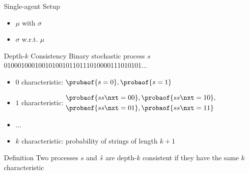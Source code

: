 \begin{frame}{Single-agent Setup}


\bigskip
{}

\begin{itemize}
  \item \(\mu\)  with \(\sigma\)
  \item \(\sigma\)  w.r.t. \(\mu\)
\end{itemize}

\end{frame}
\begin{frame}{Depth-\(k\) Consistency}
  Binary stochastic process \(s\)
  0100010001001010010110111010000111010101...

  \bigskip

  \begin{itemize}
    \item \(0\) characteristic: \(\probaof{s = 0}, \probaof{s = 1}\)
    \item \(1\) characteristic: \(\begin{aligned}
        &\probaof{s s\nxt = 00}, \probaof{s s\nxt = 10},\\
        &\probaof{s s\nxt = 01}, \probaof{s s\nxt = 11}
      \end{aligned}\)
    \item ...
    \item \(k\) characteristic: probability of strings of length \(k + 1\)
    \end{itemize}

  \bigskip

  \begin{block}{Definition}
  Two processes \(s\) and \(\hat{s}\) are depth-\(k\) consistent if they have the same \(k\) characteristic
  \end{block}
\end{frame}
